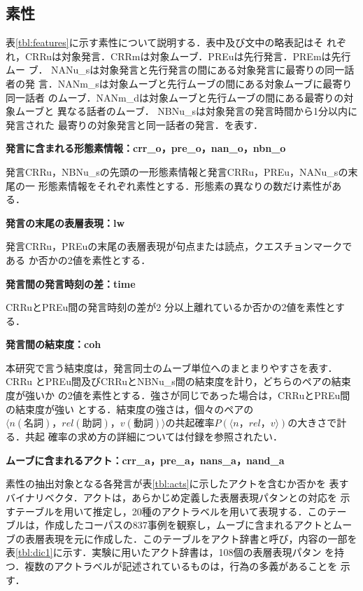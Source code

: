 \subsection{素性}

表\ref{tbl:features}に示す素性について説明する．表中及び文中の略表記はそ
れぞれ，CRRuは対象発言．CRRmは対象ムーブ．PREuは先行発言．PREmは先行ムー
ブ． NANu\_sは対象発言と先行発言の間にある対象発言に最寄りの同一話者の発
言．NANm\_sは対象ムーブと先行ムーブの間にある対象ムーブに最寄り同一話者
のムーブ．NANm\_dは対象ムーブと先行ムーブの間にある最寄りの対象ムーブと
異なる話者のムーブ． NBNu\_sは対象発言の発言時間から1分以内に発言された
最寄りの対象発言と同一話者の発言．を表す．

\begin{description}

\item{\bf 発言に含まれる形態素情報：crr\_o，pre\_o，nan\_o，nbn\_o}

発言CRRu，NBNu\_sの先頭の一形態素情報と発言CRRu，PREu，NANu\_sの末尾の一
形態素情報をそれぞれ素性とする．形態素の異なりの数だけ素性がある．

\item{\bf 発言の末尾の表層表現：lw}

発言CRRu，PREuの末尾の表層表現が句点または読点，クエスチョンマークである
か否かの2値を素性とする．

\item{\bf 発言間の発言時刻の差：time} 

CRRuとPREu間の発言時刻の差が2 分以上離れているか否かの2値を素性とする．

\item{\bf 発言間の結束度：coh} 

本研究で言う結束度は，発言同士のムーブ単位へのまとまりやすさを表す．CRRu
とPREu間及びCRRuとNBNu\_s間の結束度を計り，どちらのペアの結束度が強いか
の2値を素性とする．強さが同じであった場合は，CRRuとPREu間の結束度が強い
とする．結束度の強さは，個々のペアの$\langle n (名詞)，rel (助詞)，v(動
詞) \rangle$の共起確率$P(\langle n，rel，v \rangle)$の大きさで計る．共起
確率の求め方の詳細については付録を参照されたい．

\item{\bf ムーブに含まれるアクト：crr\_a，pre\_a，nans\_a，nand\_a} 

素性の抽出対象となる各発言が表\ref{tbl:acts}に示したアクトを含むか否かを
表すバイナリベクタ．アクトは，あらかじめ定義した表層表現パタンとの対応を
示すテーブルを用いて推定し，20種のアクトラベルを用いて表現する．このテー
ブルは，作成したコーパスの837事例を観察し，ムーブに含まれるアクトとムー
ブの表層表現を元に作成した．このテーブルをアクト辞書と呼び，内容の一部を
表\ref{tbl:dic1}に示す．実験に用いたアクト辞書は，108個の表層表現パタン
を持つ．複数のアクトラベルが記述されているものは，行為の多義があることを
示す．


\end{description}

